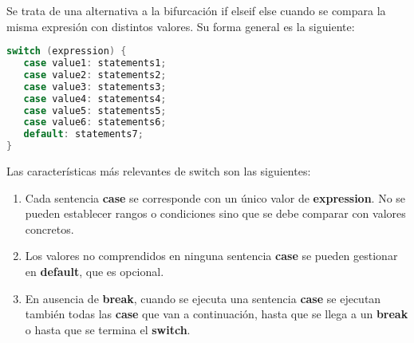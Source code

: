 Se trata de una alternativa a la bifurcación if elseif else cuando se compara la misma expresión con
distintos valores. Su forma general es la siguiente:

\begin{lstlisting}[language=C++]
switch (expression) {
   case value1: statements1;
   case value2: statements2;
   case value3: statements3;
   case value4: statements4;
   case value5: statements5;
   case value6: statements6;
   default: statements7;
}
\end{lstlisting}

Las características más relevantes de switch son las siguientes:

\begin{enumerate}
	\item Cada sentencia \textbf{case} se corresponde con un único valor de \textbf{expression}. No se pueden establecer rangos o condiciones sino que se debe comparar con valores concretos.
	\item Los valores no comprendidos en ninguna sentencia \textbf{case} se pueden gestionar en \textbf{default}, que es opcional.
	\item En ausencia de \textbf{break}, cuando se ejecuta una sentencia \textbf{case} se ejecutan también todas las \textbf{case} que van a continuación, hasta que se llega a un \textbf{break} o hasta que se termina el \textbf{switch}.
\end{enumerate}